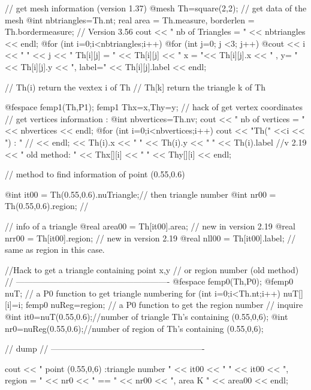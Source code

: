 \documentclass[a4paper,twoside,12pt]{book}
\begin{document}
\bFF
{ // get mesh information (version 1.37)
  @mesh Th=square(2,2);
  // get data of the mesh
  @int nbtriangles=Th.nt;
  real area = Th.measure, borderlen = Th.bordermeasure; // Version 3.56
  cout << " nb of Triangles = " << nbtriangles << endl;
  @for (int i=0;i<nbtriangles;i++)
    @for (int j=0; j <3; j++)
      @cout << i << " " << j << " Th[i][j] = "
           << Th[i][j] << "  x = "<< Th[i][j].x  << " , y= "<< Th[i][j].y
           << ",  label=" << Th[i][j].label << endl;

//    Th(i)   return   the vextex i of Th\hfilll
//   Th[k]   return   the triangle k of Th\hfilll

  @fespace femp1(Th,P1);
  femp1 Thx=x,Thy=y; //  hack of get vertex coordinates
  // get vertices information :
  @int nbvertices=Th.nv;
  cout << " nb of vertices = " << nbvertices << endl;
  @for (int i=0;i<nbvertices;i++)
        cout << "Th(" <<i  << ") : "   // << endl;
             << Th(i).x << " " << Th(i).y  << " " << Th(i).label //v 2.19
             << "       old method: " << Thx[][i] << " " << Thy[][i] << endl;

// method to find information of point (0.55,0.6)

  @int it00 = Th(0.55,0.6).nuTriangle;// then triangle number
  @int nr00 = Th(0.55,0.6).region; // 

//  info of a triangle
  @real area00 = Th[it00].area; // new in version 2.19  
  @real nrr00 = Th[it00].region; // new in version 2.19   
  @real nll00 = Th[it00].label; // same as region in this case.  


//Hack  to get a triangle containing point x,y\hfilll
//     or   region number (old method) \hfilll
// ------------------------------------------------------- \hfilll
  @fespace femp0(Th,P0);
  @femp0 nuT; // a P0 function  to get triangle numbering
    for (int i=0;i<Th.nt;i++)
     nuT[][i]=i;
  femp0 nuReg=region; // a P0 function to get the region number
  //  inquire
  @int it0=nuT(0.55,0.6);//number of triangle Th's containing (0.55,0,6);
  @int nr0=nuReg(0.55,0.6);//number of region of Th's containing (0.55,0,6);


 // dump  \hfilll
 // ------------------------------------------------------- \hfilll

  cout << "  point (0.55,0,6) :triangle number " << it00 << " " << it00
       << ", region = " << nr0 << " == " << nr00 << ",  area K " << area00 << endl;

}
\end{document}
